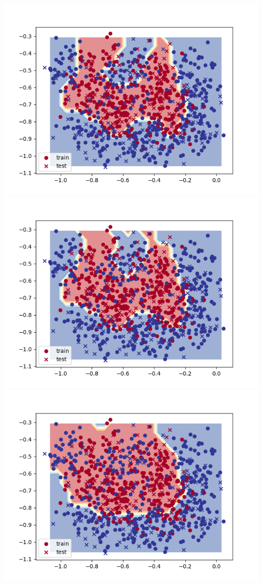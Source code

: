     \includegraphics[width=\textwidth / 2]{plots/kmeans_noisy_boundary_20}
    \includegraphics[width=\textwidth / 2]{plots/kmeans_noisy_boundary_50}
    \includegraphics[width=\textwidth / 2]{plots/kmeans_noisy_boundary_100}
